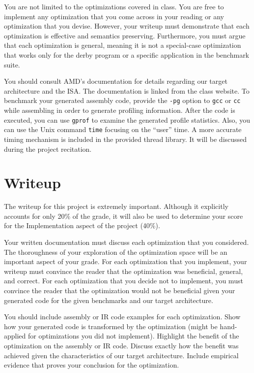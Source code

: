 You are not limited to the optimizations covered in class.  You are
free to implement any optimization that you come across in your
reading or any optimization that you devise.  However, your writeup
must demonstrate that each optimization is effective and semantics
preserving.  Furthermore, you must argue that each optimization is
general, meaning it is not a special-case optimization that works only
for the derby program or a specific application in the benchmark suite.

You should consult AMD's documentation for details regarding our
target architecture and the ISA.  The documentation is linked from the
class website.  To benchmark your generated assembly code, provide the
{\tt -pg} option to {\tt gcc} or {\tt cc} while assembling in order to
generate profiling information.  After the code is executed, you can
use {\tt gprof} to examine the generated profile statistics.  Also,
you can use the Unix command {\tt time} focusing on the ``user''
time. A more accurate timing mechanism is included in the provided
thread library.  It will be discussed during the project recitation. 

\section*{Writeup}
The writeup for this project is extremely important. Although it
explicitly accounts for only 20\% of the grade, it will also be used
to determine your score for the Implementation aspect of the project
(40\%).

Your written documentation must discuss each optimization that you
considered.  The thoroughness of your exploration of the optimization
space will be an important aspect of your grade.  For each
optimization that you implement, your writeup must convince the reader
that the optimization was beneficial, general, and correct.  For each
optimization that you decide not to implement, you must convince the
reader that the optimization would not be beneficial given your
generated code for the given benchmarks and our target architecture.

You should include assembly or IR code examples for each
optimization. Show how your generated code is transformed by the
optimization (might be hand-applied for optimizations you did not
implement). Highlight the benefit of the optimization on the
assembly or IR code. Discuss exactly how the benefit was achieved
given the characteristics of our target architecture.  Include
empirical evidence that proves your conclusion for the optimization.

